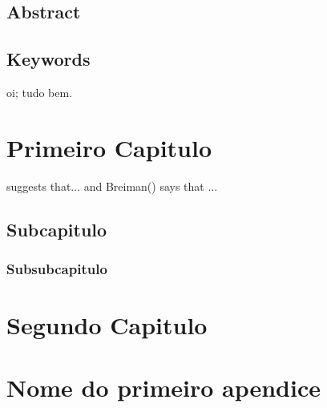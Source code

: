 \documentclass[12pt,openright,twoside,a4paper,brazil,english,emptypage,openany]{abntex2}
\makeatletter
\renewcommand{\tableofcontents}{%
  \chapter*{\contentsname}
  \@starttoc{toc}
}
\makeatother
\begin{document}
\lipsum[1]

\newpage

\section*{\large Abstract}
\justifying

\lipsum[1]

\vspace{4\onelineskip}
\noindent
\section*{\large Keywords}
\hspace{1em} oi; tudo bem.


\sffamily
\tableofcontents



\rmfamily %

\chapter{Primeiro Capitulo}
\justifying

\lipsum[1]

\cite{elliott2013complete} suggests that... and Breiman(\citeyear{elliott2013complete}) says that ...

\section{Subcapitulo}
\justifying

\lipsum[1]

\subsection{Subsubcapitulo}
\justifying

\lipsum[1]

\lipsum[1]

\lipsum[1]

\lipsum[1]

\chapter{Segundo Capitulo}
\justifying

\lipsum[1]





\appendix

\chapter{Nome do primeiro apendice}
\justifying
\end{document}
